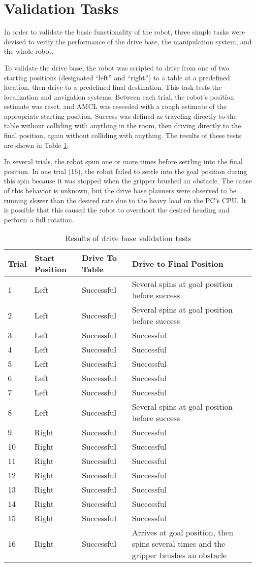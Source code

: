 \documentclass[]{cwru} %
\begin{document}
\section{Validation Tasks}

In order to validate the basic functionality of the robot, three simple
tasks were devised to verify the performance of the drive base, the
manipulation system, and the whole robot.

To validate the drive base, the robot was scripted to drive from one of
two starting positions (designated ``left'' and ``right'') to a table at
a predefined location, then drive to a predefined final destination.
This task tests the localization and navigation systems. Between each
trial, the robot's position estimate was reset, and AMCL was reseeded
with a rough estimate of the appropriate starting position. Success was
defined as traveling directly to the table without colliding with
anything in the room, then driving directly to the final position, again
without colliding with anything. The results of these tests are shown in
Table \ref{tab:drive-validation}.

In several trials, the robot spun one or more times before settling into
the final position. In one trial (16), the robot failed to settle into
the goal position during this spin because it was stopped when the
gripper brushed an obstacle. The cause of this behavior is unknown, but
the drive base planners were observed to be running slower than the
desired rate due to the heavy load on the PC's CPU. It is possible that
this caused the robot to overshoot the desired heading and perform a
full rotation.

\begin{longtable}[c]{lllp{7.5cm}}
\caption{Results of drive base validation tests}
\label{tab:drive-validation}\tabularnewline
\endfirsthead
\toprule
\textbf{Trial} & \textbf{Start Position} & \textbf{Drive To Table} &
\textbf{Drive to Final Position}\tabularnewline
\midrule
1 & Left & Successful & Several spins at goal position before
success\tabularnewline
2 & Left & Successful & Several spins at goal position before
success\tabularnewline
3 & Left & Successful & Successful\tabularnewline
4 & Left & Successful & Successful\tabularnewline
5 & Left & Successful & Successful\tabularnewline
6 & Left & Successful & Successful\tabularnewline
7 & Left & Successful & Successful\tabularnewline
8 & Left & Successful & Several spins at goal position before
success\tabularnewline
9 & Right & Successful & Successful\tabularnewline
10 & Right & Successful & Successful\tabularnewline
11 & Right & Successful & Successful\tabularnewline
12 & Right & Successful & Successful\tabularnewline
13 & Right & Successful & Successful\tabularnewline
14 & Right & Successful & Successful\tabularnewline
15 & Right & Successful & Successful\tabularnewline
16 & Right & Successful & Arrives at goal position, then spins several
times and the gripper brushes an obstacle\tabularnewline
\bottomrule
\end{longtable}
\end{document}
